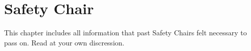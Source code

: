 \chapter{Safety Chair}
This chapter includes all information that past Safety Chairs felt necessary
to pass on. Read at your own discression.
